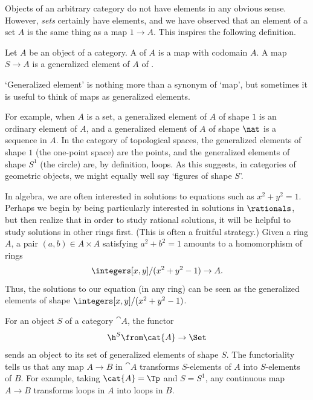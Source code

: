 Objects of an arbitrary category do not have elements in any obvious sense.
However, \emph{sets} certainly have elements, and we have observed that an
element of a set $A$ is the same thing as a map $1 \to A$.  This inspires
the following definition.

\begin{defn}    
\label{defn:gen-elt}
Let $A$ be an object of a category.  A  of $A$ is a map with codomain $A$.  A map $S \to A$ is a
generalized element of $A$ of .
\end{defn}

`Generalized element' is nothing more than a synonym of `map', but
sometimes it is useful to think of maps as generalized elements.

For example, when $A$ is a set, a generalized element of $A$ of shape $1$
is an ordinary element of $A$, and a generalized element of $A$ of shape
$\nat$ is a sequence%
%
%
in $A$.  In the category of topological spaces, the generalized elements of
shape $1$ (the one-point space) are the points, and the generalized
elements of shape $S^1$ (the circle) are, by definition, loops.%
%
%
As this suggests, in categories of geometric objects, we might equally well
say `figures of shape $S$'.

In algebra,%
%
%
we are often interested in solutions to equations such as $x^2 + y^2 = 1$.
Perhaps we begin by being particularly interested in solutions in
$\rationals$, but then realize that in order to study rational solutions,
it will be helpful to study solutions in other rings first.  (This is often
a fruitful strategy.)  Given a ring $A$, a pair $(a, b) \in A \times A$
satisfying $a^2 + b^2 = 1$ amounts to a homomorphism of rings
\[
\integers[x, y]/(x^2 + y^2 - 1) \to A.
%
\index{algebraic geometry}
%
\]
Thus, the solutions to our equation (in any ring) can be seen as the
generalized elements of shape $ \integers[x, y]/(x^2 + y^2 - 1)$.

For an object $S$ of a category $\cat{A}$, the functor
\[
\h^S\from \cat{A} \to \Set
\]
sends an object to its set of generalized elements of shape $S$.  The
functoriality tells us that any map $A \to B$ in $\cat{A}$ transforms
$S$-elements of $A$ into $S$-elements of $B$.  For example, taking $\cat{A}
= \Tp$ and $S = S^1$, any continuous map $A \to B$ transforms loops in $A$
into loops in $B$.%
%
%



